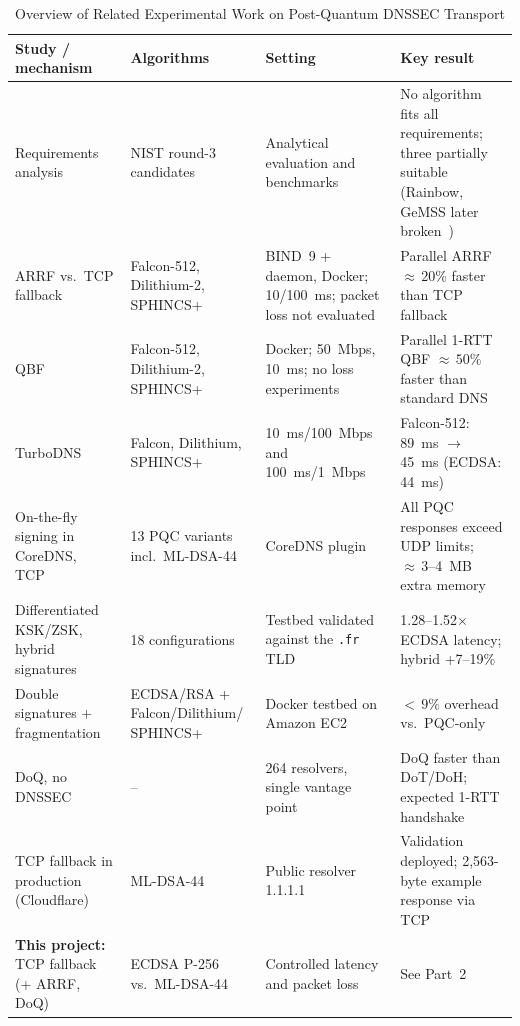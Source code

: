 \documentclass[conference]{IEEEtran}
\begin{document}
\begin{table}[!t]
\caption{Overview of Related Experimental Work on Post-Quantum DNSSEC Transport}
\label{tab:related}
\centering
\footnotesize
\begin{tabularx}{\textwidth}{|X|X|X|X|}
\hline
\textbf{Study / mechanism} & \textbf{Algorithms} & \textbf{Setting} & \textbf{Key result} \\
\hline
Requirements analysis~\cite{retrofitting} & NIST round-3 candidates & Analytical evaluation and benchmarks & No algorithm fits all requirements; three partially suitable (Rainbow, GeMSS later broken~\cite{nistir8413}) \\
\hline
ARRF vs.\ TCP fallback~\cite{arrf} & Falcon-512, Dilithium-2, SPHINCS+ & BIND~9 + daemon, Docker; 10/100~ms; packet loss not evaluated & Parallel ARRF ${\approx}\,20\%$ faster than TCP fallback \\
\hline
QBF~\cite{qbf} & Falcon-512, Dilithium-2, SPHINCS+ & Docker; 50~Mbps, 10~ms; no loss experiments & Parallel 1-RTT QBF ${\approx}\,50\%$ faster than standard DNS \\
\hline
TurboDNS~\cite{turbodns} & Falcon, Dilithium, SPHINCS+ & 10~ms/100~Mbps and 100~ms/1~Mbps & Falcon-512: 89~ms $\rightarrow$ 45~ms (ECDSA: 44~ms) \\
\hline
On-the-fly signing in CoreDNS, TCP~\cite{corednspqc} & 13 PQC variants incl.\ ML-DSA-44 & CoreDNS plugin & All PQC responses exceed UDP limits; ${\approx}\,3$--4~MB extra memory \\
\hline
Differentiated KSK/ZSK, hybrid signatures~\cite{differentiated} & 18 configurations & Testbed validated against the \texttt{.fr} TLD & 1.28--1.52$\times$ ECDSA latency; hybrid +7--19\% \\
\hline
Double signatures + fragmentation~\cite{doublesigned} & ECDSA/RSA + Falcon/Dilithium/ SPHINCS+ & Docker testbed on Amazon EC2 & ${<}\,9\%$ overhead vs.\ PQC-only \\
\hline
DoQ, no DNSSEC~\cite{doqfirstlook} & -- & 264 resolvers, single vantage point & DoQ faster than DoT/DoH; expected 1-RTT handshake \\
\hline
TCP fallback in production (Cloudflare)~\cite{cloudflareblog} & ML-DSA-44 & Public resolver 1.1.1.1 & Validation deployed; 2,563-byte example response via TCP \\
\hline
\textbf{This project:} TCP fallback (+ ARRF, DoQ) & ECDSA P-256 vs.\ ML-DSA-44 & Controlled latency and packet loss & See Part~2 \\
\hline
\end{tabularx}
\end{table}
\end{document}
